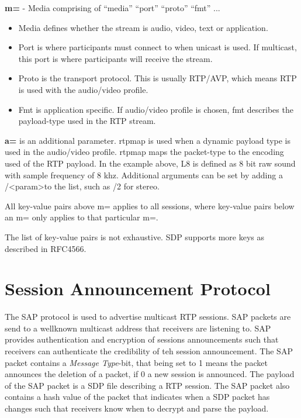 \textbf{m=} - Media comprising of ``media'' ``port'' ``proto'' ``fmt'' ...
\begin{itemize}
	\item Media defines whether the stream is audio, video, text or application.
	\item Port is where participants must connect to when unicast is used. If multicast, this port is where participants will receive the stream.
	\item Proto is the transport protocol. This is usually RTP/AVP, which means RTP is used with the audio/video profile.
	\item Fmt is application specific. If audio/video profile is chosen, fmt describes the payload-type used in the RTP stream.
\end{itemize}
\textbf{a=} is an additional parameter. rtpmap is used when a dynamic payload type is used in the audio/video profile. rtpmap maps the packet-type to the encoding used of the RTP payload. In the example above, L8 is defined as 8 bit raw sound with sample frequency of 8 khz. Additional arguments can be set by adding a /\textless param\textgreater to the list, such as /2 for stereo.

All key-value pairs above m= applies to all sessions, where key-value pairs below an m= only applies to that particular m=. 

The list of key-value pairs is not exhaustive. SDP supports more keys as described in RFC4566.


\section{Session Announcement Protocol} \label{sec:design:sap}
The \ac{SAP} protocol is used to advertise multicast RTP sessions. SAP packets are send to a wellknown multicast address that receivers are listening to. SAP provides authentication and encryption of sessions announcements such that receivers can authenticate the credibility of teh session announcement. The SAP packet contains a \textit{Message Type}-bit, that being set to 1 means the packet announces the deletion of a packet, if 0 a new session is announced. The payload of the SAP packet is a SDP file describing a RTP session. The SAP packet also contains a hash value of the packet that indicates when a SDP packet has changes such that receivers know when to decrypt and parse the payload. \citep{RFC2974}


